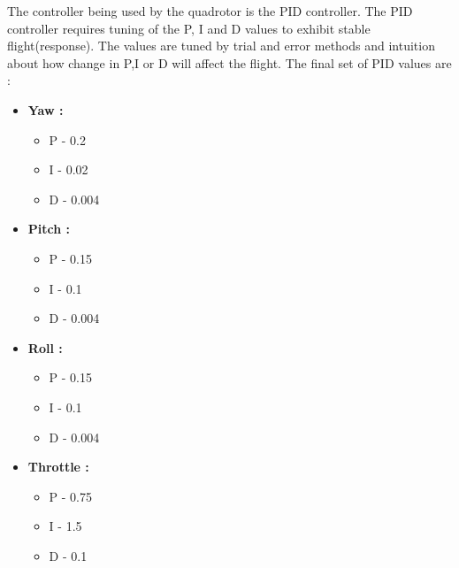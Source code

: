 The controller being used by the quadrotor is the PID controller. The PID controller requires tuning of the P, I and D values to exhibit stable flight(response). The values are tuned by trial and error methods and intuition about how change in P,I or D will affect the flight. The final set of PID values are :
\begin{itemize}
  \item \textbf{Yaw :}
    \begin{itemize}
      \item P - 0.2
      \item I - 0.02
      \item D - 0.004
    \end{itemize}

  \item \textbf{Pitch :}
    \begin{itemize}
      \item P - 0.15
      \item I - 0.1
      \item D - 0.004
    \end{itemize}

  \item \textbf{Roll :}
    \begin{itemize}
      \item P - 0.15
      \item I - 0.1
      \item D - 0.004
    \end{itemize}

  \item \textbf{Throttle :}
    \begin{itemize}
      \item P - 0.75
      \item I - 1.5
      \item D - 0.1
    \end{itemize}

\end{itemize}

